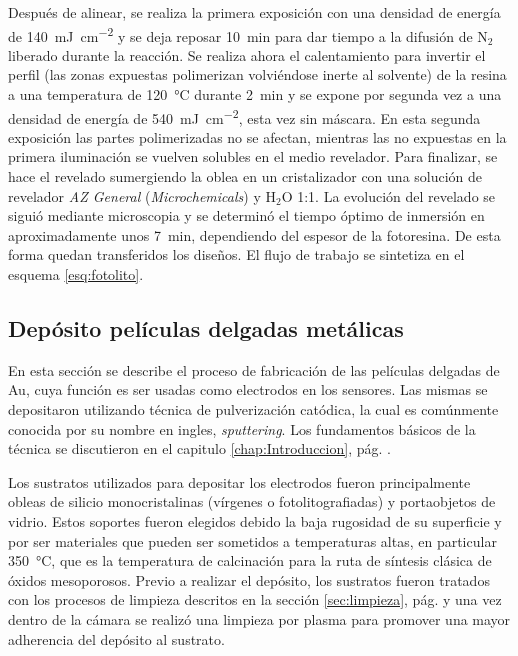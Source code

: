 		Después de alinear, se realiza la primera exposición con una densidad de energía de \SI{140}{mJ.\cm^{-2}} y se deja reposar \SI{10}{\minute} para dar tiempo a la difusión de N$_2$ liberado durante la reacción. Se realiza ahora el calentamiento para invertir el perfil (las zonas expuestas polimerizan volviéndose inerte al solvente) de la resina a una temperatura de \SI{120}{\celsius} durante \SI{2}{\minute}  y se expone por segunda vez a una densidad de energía de \SI{540}{mJ.cm^{-2}}, esta vez sin máscara. En esta segunda exposición las partes polimerizadas no se afectan, mientras las no expuestas en la primera iluminación se vuelven solubles en el medio revelador. Para finalizar, se hace el revelado sumergiendo la oblea en un cristalizador con una solución de revelador \textit{AZ General} (\textit{Microchemicals}) y H$_2$O 1:1. La evolución del revelado se siguió mediante microscopia y se determinó el tiempo óptimo de inmersión en aproximadamente unos \SI{7}{\minute}, dependiendo del espesor de la fotoresina. De esta forma quedan transferidos los diseños. El flujo de trabajo se sintetiza en el esquema \ref{esq:fotolito}.
			 
	\subsection{Depósito películas delgadas metálicas}\label{sec:sputt}

			En esta sección se describe el proceso de fabricación de las películas delgadas de Au, cuya función es ser usadas como electrodos en los sensores. Las mismas se depositaron utilizando técnica de pulverización catódica, la cual es comúnmente conocida por su nombre en ingles, \textit{sputtering}\cite{sigmund1968}. Los fundamentos básicos de la técnica se discutieron en el capitulo \ref{chap:Introduccion}, pág. \pageref{sec:microfabricacion}.
							
			Los sustratos utilizados para depositar los electrodos fueron principalmente obleas de silicio monocristalinas (vírgenes o fotolitografiadas) y portaobjetos de vidrio. Estos soportes fueron elegidos debido la baja rugosidad de su superficie y por ser materiales que pueden ser sometidos a temperaturas altas, en particular \SI{350}{\celsius}, que es la temperatura de calcinación para la ruta de síntesis clásica de óxidos mesoporosos. Previo a realizar el depósito, los sustratos fueron tratados con los procesos de limpieza descritos en la sección \ref{sec:limpieza}, pág. \pageref{sec:limpieza} y una vez dentro de la cámara se realizó una limpieza por plasma para promover una mayor adherencia del depósito al sustrato.

